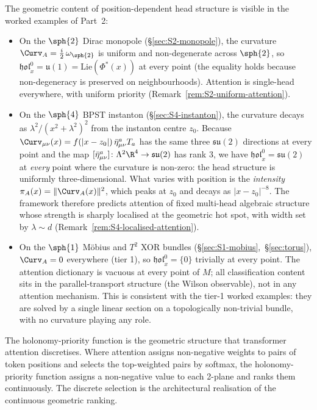 The geometric content of position-dependent head structure is
visible in the worked examples of Part~2:

\begin{itemize}[leftmargin=2em]
\item On the $\sph{2}$ Dirac monopole (\S\ref{sec:S2-monopole}),
the curvature $\Curv_A=\tfrac{i}{2}\,\omega_{\sph{2}}$ is uniform
and non-degenerate across $\sph{2}$, so
$\mathfrak{hol}^0_x=\mathfrak{u}(1)=\mathrm{Lie}(\Phi^*(x))$ at every
point (the equality holds because non-degeneracy is preserved on
neighbourhoods). Attention is single-head everywhere, with uniform
priority (Remark~\ref{rem:S2-uniform-attention}).

\item On the $\sph{4}$ BPST instanton (\S\ref{sec:S4-instanton}),
the curvature decays as $\lambda^2/(x^2+\lambda^2)^2$ from the
instanton centre $z_0$. Because
$\Curv_{\mu\nu}(x)=f(|x-z_0|)\,\bar\eta^a_{\mu\nu}T_a$ has the same
three $\mathfrak{su}(2)$ directions at every point and the map
$[\bar\eta^a_{\mu\nu}]\colon\Lambda^2\R^4\to\mathfrak{su}(2)$ has
rank $3$, we have $\mathfrak{hol}^0_x=\mathfrak{su}(2)$ at
\emph{every} point where the curvature is non-zero: the head
structure is uniformly three-dimensional. What varies with position
is the \emph{intensity} $\pi_A(x)=\|\Curv_A(x)\|^2$, which peaks at
$z_0$ and decays as $|x-z_0|^{-8}$. The framework therefore predicts
attention of fixed multi-head algebraic structure whose strength is
sharply localised at the geometric hot spot, with width set by
$\lambda\sim d$ (Remark~\ref{rem:S4-localised-attention}).

\item On the $\sph{1}$ M\"obius and $T^2$ XOR bundles
(\S\ref{sec:S1-mobius},~\S\ref{sec:torus}), $\Curv_A=0$ everywhere
(tier 1), so $\mathfrak{hol}^0_x=\{0\}$ trivially at every point.
The attention dictionary is vacuous at every point of $M$; all
classification content sits in the parallel-transport structure
(the Wilson observable), not in any attention mechanism. This is
consistent with the tier-1 worked examples: they are solved by a
single linear section on a topologically non-trivial bundle, with
no curvature playing any role.
\end{itemize}

The holonomy-priority function is the geometric structure that
transformer attention discretises. Where attention assigns
non-negative weights to pairs of token positions and selects the
top-weighted pairs by softmax, the holonomy-priority function assigns
a non-negative value to each 2-plane and ranks them continuously. The
discrete selection is the architectural realisation of the
continuous geometric ranking.

